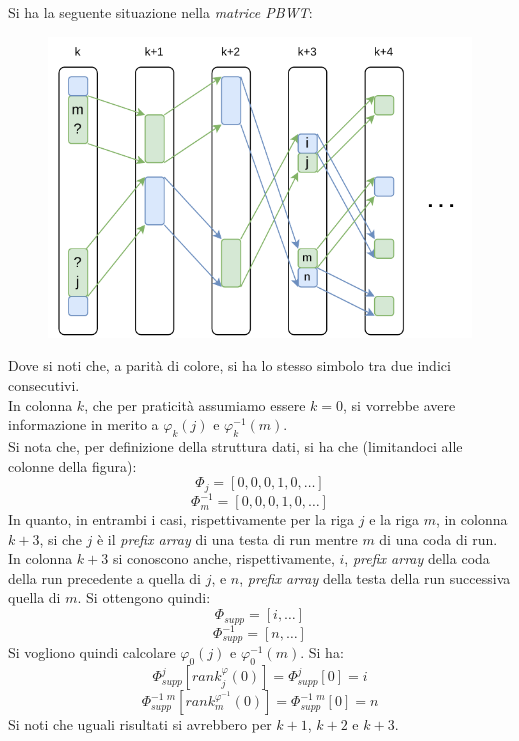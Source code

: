 \begin{esempio}
  Si ha la seguente situazione nella \textit{matrice PBWT}:
  \begin{figure}[H]
    \centering
    \includegraphics[scale = 0.8]{img/phi.pdf}   
  \end{figure}
  Dove si noti che, a parità di colore, si ha lo stesso simbolo tra due indici
  consecutivi. \\
  In colonna $k$, che per praticità assumiamo essere $k=0$, si vorrebbe avere
  informazione in merito a $\varphi_k(j)$ e $\varphi^{-1}_k(m)$. \\
  Si nota che, per definizione della struttura dati, si ha che (limitandoci alle
  colonne della figura):
  \[\varPhi_j=[0,0,0,1,0, \ldots]\]
  \[\varPhi^{-1}_m=[0,0,0,1,0,\ldots]\]
  In quanto, in entrambi i casi, rispettivamente per la riga $j$ e la riga $m$,
  in colonna $k+3$, si che $j$ è il \textit{prefix array} di una testa di run
  mentre $m$ di una coda di run. In colonna $k+3$ si conoscono anche,
  rispettivamente, $i$, \textit{prefix array} della coda della run precedente a
  quella di $j$, e $n$, \textit{prefix array} della testa della run successiva
  quella di $m$. Si ottengono quindi:
  \[\varPhi_{supp}=[i,\ldots]\]
  \[\varPhi^{-1}_{supp}=[n,\ldots]\]
  Si vogliono quindi calcolare $\varphi_0(j)$ e  $\varphi^{-1}_0(m)$. Si ha:
  \[\varPhi_{supp}^j[rank^\varphi_j(0)]=\varPhi_{supp}^j[0]=i\]
  \[\varPhi^{-1\,\,m}_{supp}[rank^{\varphi^{-1}}_m(0)]=\varPhi^{-1\,\,m}_{supp}[0]=n\]
  Si noti che uguali risultati si avrebbero per $k+1$, $k+2$ e $k+3$.
\end{esempio}
